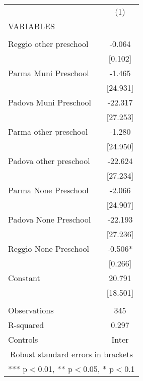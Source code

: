 \begin{tabular}{lc} \hline
 & (1) \\
VARIABLES &  \\ \hline
 &  \\
Reggio other preschool & -0.064 \\
 & [0.102] \\
Parma Muni Preschool & -1.465 \\
 & [24.931] \\
Padova Muni Preschool & -22.317 \\
 & [27.253] \\
Parma other preschool & -1.280 \\
 & [24.950] \\
Padova other preschool & -22.624 \\
 & [27.234] \\
Parma None Preschool & -2.066 \\
 & [24.907] \\
Padova None Preschool & -22.193 \\
 & [27.236] \\
Reggio None Preschool & -0.506* \\
 & [0.266] \\
Constant & 20.791 \\
 & [18.501] \\
 &  \\
Observations & 345 \\
R-squared & 0.297 \\
 Controls & Inter \\ \hline
\multicolumn{2}{c}{ Robust standard errors in brackets} \\
\multicolumn{2}{c}{ *** p$<$0.01, ** p$<$0.05, * p$<$0.1} \\
\end{tabular}
